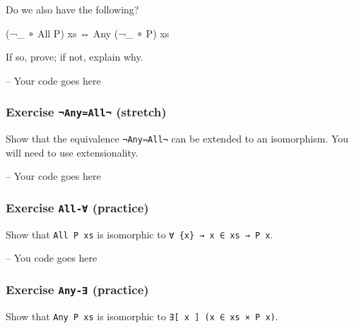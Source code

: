 Do we also have the following?

\begin{myDisplay}
(¬_ ∘ All P) xs ⇔ Any (¬_ ∘ P) xs
\end{myDisplay}

If so, prove; if not, explain why.

\begin{fence}
\begin{code}
-- Your code goes here
\end{code}
\end{fence}

\hypertarget{exercise-anyall-stretch}{%
\subsubsection{\texorpdfstring{Exercise \texttt{¬Any≃All¬}
(stretch)}{Exercise ¬Any≃All¬ (stretch)}}\label{exercise-anyall-stretch}}

Show that the equivalence \texttt{¬Any⇔All¬} can be extended to an
isomorphism. You will need to use extensionality.

\begin{fence}
\begin{code}
-- Your code goes here
\end{code}
\end{fence}

\hypertarget{exercise-all--practice}{%
\subsubsection{\texorpdfstring{Exercise \texttt{All-∀}
(practice)}{Exercise All-∀ (practice)}}\label{exercise-all--practice}}

Show that \texttt{All\ P\ xs} is isomorphic to
\texttt{∀\ \{x\}\ →\ x\ ∈\ xs\ →\ P\ x}.

\begin{fence}
\begin{code}
-- You code goes here
\end{code}
\end{fence}

\hypertarget{exercise-any--practice}{%
\subsubsection{\texorpdfstring{Exercise \texttt{Any-∃}
(practice)}{Exercise Any-∃ (practice)}}\label{exercise-any--practice}}

Show that \texttt{Any\ P\ xs} is isomorphic to
\texttt{∃{[}\ x\ {]}\ (x\ ∈\ xs\ ×\ P\ x)}.

